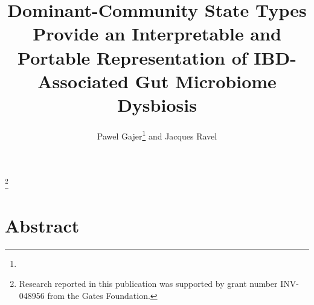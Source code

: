 \documentclass[
  11pt,
]{article}
\title{Dominant-Community State Types Provide an Interpretable and
Portable Representation of IBD-Associated Gut Microbiome Dysbiosis}
\author{\parbox{0.9\textwidth}{\centering Pawel Gajer\thanks{\paperaffiliation} and Jacques Ravel\protect\footnotemark[1]}}
\date{}
\newcommand{\paperfundingnote}{Research reported in this publication was supported by grant number INV-048956 from the Gates Foundation.}
\newcommand{\blfootnote}[1]{%
  \begingroup
  \renewcommand{\thefootnote}{}\footnote{#1}%
  \addtocounter{footnote}{-1}%
  \endgroup
}
\newif\ifshowbuildstamp
\providecommand{\manuscriptversion}{unversioned}
\providecommand{\manuscriptbuildnumber}{NA}
\providecommand{\manuscriptcommit}{unknown}
\providecommand{\manuscriptbuilddatetime}{unknown}
\begin{document}
\maketitle
\blfootnote{\paperfundingnote}
\ifshowbuildstamp
\begin{center}
\footnotesize
Built \manuscriptbuilddatetime
\end{center}
\vspace{0.35em}
\fi

\section{Abstract}\label{abstract}
\end{document}
